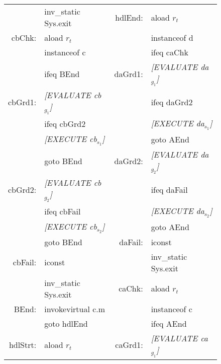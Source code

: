 \documentclass[10pt,twocolumn]{article}
\begin{document}
\begin{figure}[!ht]
{\begin{tabular}{@{}r @{~} l @{$\>$}|@{$\>\>$} r @{~} l@{}}
              & inv\_static Sys.exit                     & hdlEnd:       & aload $r_t$                               \\
cbChk:        & aload $r_t$                              &               & instanceof d                              \\
              & instanceof c                             &               & ifeq caChk                                \\
              & ifeq BEnd                                & daGrd1:       & {\slshape [EVALUATE da$_{g_1}$]}          \\
cbGrd1:       & {\slshape [EVALUATE cb$_{g_1}$]}         &               & ifeq daGrd2                               \\
              & ifeq cbGrd2                              &               & {\slshape [EXECUTE da$_{s_1}$]}           \\
              & {\slshape [EXECUTE cb$_{s_1}$]}          &               & goto AEnd                                 \\
              & goto BEnd                                & daGrd2:       & {\slshape [EVALUATE da$_{g_2}$]}          \\
cbGrd2:       & {\slshape [EVALUATE cb$_{g_2}$]}         &               & ifeq daFail                               \\
              & ifeq cbFail                              &               & {\slshape [EXECUTE da$_{s_2}$]}           \\
              & {\slshape [EXECUTE cb$_{s_2}$]}          &               & goto AEnd                                 \\
              & goto BEnd                                & daFail:       & iconst\textunderscore 1                   \\
cbFail:       & iconst\textunderscore 1                  &               & inv\_static Sys.exit                      \\
              & inv\_static Sys.exit                     & caChk:        & aload $r_t$                               \\
BEnd:         & invokevirtual c.m                        &               & instanceof c                              \\
              & goto hdlEnd                              &               & ifeq AEnd                                 \\
hdlStrt:      & aload $r_t$                              & caGrd1:       & {\slshape [EVALUATE ca$_{g_1}$]}          \\

\end{tabular}}
\end{figure}
\end{document}
